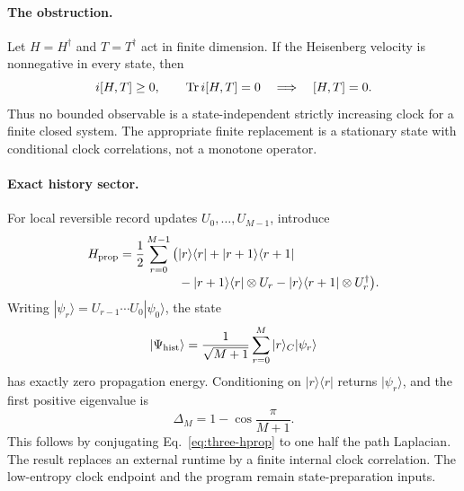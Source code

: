 \paragraph{The obstruction.}
Let \(H=H^\dagger\) and \(T=T^\dagger\) act in finite dimension.  If the
Heisenberg velocity is nonnegative in every state, then
\begin{equation}
 i[H,T]\geq0,\qquad \operatorname{Tr} i[H,T]=0
 \quad\Longrightarrow\quad [H,T]=0.
\label{eq:three-clock-no-go}
\end{equation}
Thus no bounded observable is a state-independent strictly increasing clock
for a finite closed system.  The appropriate finite replacement is a
stationary state with conditional clock correlations, not a monotone
operator.

\paragraph{Exact history sector.}
For local reversible record updates \(U_0,\ldots,U_{M-1}\), introduce
\begin{align}
 H_{\rm prop}
 =\frac12\sum_{r=0}^{M-1}\big(&
 |r\rangle\langle r|+|r+1\rangle\langle r+1|\nonumber\\[-1mm]
 &-|r+1\rangle\langle r|\otimes U_r
 -|r\rangle\langle r+1|\otimes U_r^\dagger\big).
\label{eq:three-hprop}
\end{align}
Writing
\(|\psi_r\rangle=U_{r-1}\cdots U_0|\psi_0\rangle\), the state
\begin{equation}
 |\Psi_{\rm hist}\rangle
 =\frac1{\sqrt{M+1}}\sum_{r=0}^{M}
 |r\rangle_C|\psi_r\rangle
\label{eq:three-history}
\end{equation}
has exactly zero propagation energy.  Conditioning on
\(|r\rangle\langle r|\) returns \(|\psi_r\rangle\), and the first positive
eigenvalue is
\begin{equation}
 \Delta_M=1-\cos\frac{\pi}{M+1}.
\label{eq:three-history-gap}
\end{equation}
This follows by conjugating Eq.~\eqref{eq:three-hprop} to one half the path
Laplacian.  The result replaces an external runtime by a finite internal
clock correlation.  The low-entropy clock endpoint and the program remain
state-preparation inputs.

